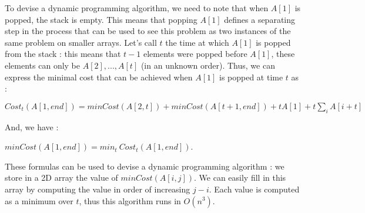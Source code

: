 To devise a dynamic programming algorithm, we need to note that when $A[1]$ is popped, the stack is empty. This means that popping $A[1]$ defines a separating step in the process that can be used to see this problem as two instances of the same problem on smaller arrays. Let's call $t$ the time at which $A[1]$ is popped from the stack : this means that $t-1$ elements were popped before $A[1]$, these elements can only be $A[2],...,A[t]$ (in an unknown order). Thus, we can express the minimal cost that can be achieved when $A[1]$ is popped at time $t$ as :

$Cost_{t}(A[1,end]) = minCost(A[2,t])+minCost(A[t+1,end])+t A[1]+t\sum_{i}{A[i+t]}$

And, we have :

$minCost(A[1,end]) = min_{t}\ Cost_{t}(A[1,end]) $.

These formulas can be used to devise a dynamic programming algorithm : we store in a 2D array the value of $minCost(A[i,j])$. We can easily fill in this array by computing the value in order of increasing $j-i$. Each value is computed as a minimum over $t$, thus this algorithm runs in $O(n^3).$